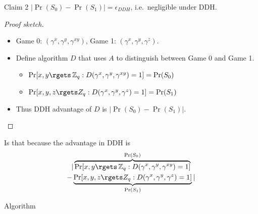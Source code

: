 \begin{frame}
  \begin{block}{Claim 2}
    \(|\Pr(S_0) - \Pr(S_1)| = \epsilon_{DDH}\), i.e.\ negligible under 
    \ac{DDH}.
  \end{block}

  \begin{proof}[Proof sketch]
    \begin{itemize}
      \item Game 0: \((\gamma^x, \gamma^y, \gamma^{xy})\),
        Game 1: \((\gamma^x, \gamma^y, \gamma^z)\).

      \item Define algorithm \(D\) that uses \(A\) to distinguish between Game 
        0 and Game 1.

        \pause{}

        \begin{itemize}
          \item \(\Pr[ x, y\rgets \Z_q : D(\gamma^x, \gamma^y, \gamma^{xy} 
              ) = 1 ] = \Pr(S_0)\)

          \item \(\Pr[ x, y, z\rgets Z_q : D(\gamma^x, \gamma^y, \gamma^z) 
              = 1 ] = \Pr(S_1)\)
        \end{itemize}

      \item \color{red} Thus \ac{DDH} advantage of \(D\) is \(|\Pr(S_0) 
          - \Pr(S_1)|\).
    \end{itemize}
  \end{proof}
\end{frame}

\begin{frame}
  \begin{question}
    Is that because the advantage in \ac{DDH} is
    \begin{multline*}
      |\overbrace{\Pr[ x, y\rgets \Z_q : D(\gamma^x, \gamma^y, \gamma^{xy} 
        ) = 1 ]}^{\Pr(S_0)}\\
      - \underbrace{\Pr[ x, y, z\rgets Z_q : D(\gamma^x, \gamma^y, \gamma^z) 
        = 1 ]}_{\Pr(S_1)}|
    \end{multline*}
  \end{question}
\end{frame}

\begin{frame}
  \begin{block}{Algorithm}
    \begin{algorithmic}
        \Else{}
        \EndIf{}
      \EndFunction{}
    \end{algorithmic}
  \end{block}
\end{frame}

